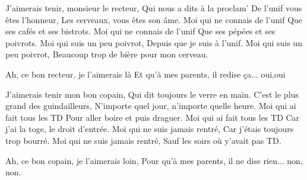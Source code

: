 \beginverse
J'aimerais tenir, monsieur le recteur,
Qui nous a dits à la proclam'
De l'unif vous êtes l'honneur,
Les cerveaux, vous êtes son âme.
Moi qui ne connais de l'unif
Que ses cafés et ses bistrots.
Moi qui ne connais de l'unif
Que ses pépées et ses poivrots.
Moi qui suis un peu poivrot,
Depuis que je suis à l'unif.
Moi qui suis un peu poivrot,
Beaucoup trop de bière pour mon cerveau.
\endverse

\beginchorus
Ah, ce bon recteur, je l'aimerais là
Et qu'à mes parents, il redise ça... oui,oui
\endchorus

\beginverse
J'aimerais tenir mon bon copain,
Qui dit toujours le verre en main.
C'est le plus grand des guindailleurs,
N'importe quel jour, n'importe quelle heure.
Moi qui ai fait tous les TD
Pour aller boire et puis draguer.
Moi qui ai fait tous les TD
Car j'ai la toge, le droit d'entrée.
Moi qui ne suis jamais rentré,
Car j'étais toujours trop bourré.
Moi qui ne suis jamais rentré,
Sauf les soirs où y'avait pas TD.
\endverse

\beginchorus
Ah, ce bon copain, je l'aimerais loin,
Pour qu'à mes parents, il ne dise rien... non, non.
\endchorus

\endsong
